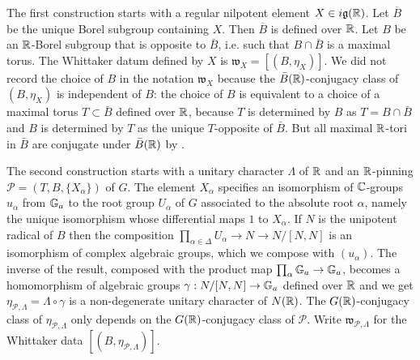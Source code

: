\documentclass{article}
\newtheorem{lem}[thm]{Lemma}
\theoremstyle{definition}
\numberwithin{equation}{section}
\renewcommand{\-}{\hyp{}}
\newcommand{\g}{\mathfrak g}
\renewcommand{\P}{\mathcal P}
\newcommand{\w}{\mathfrak w}
\begin{document}
The first construction starts with a regular nilpotent element $X\in i\g(\R)$. Let $\overline B$ be the unique Borel subgroup 
containing $X$. Then $\overline B$ is defined over $\mathbb{R}$. Let $B$ be an $\mathbb{R}$-Borel subgroup that is opposite to $\bar B$, i.e. such that $B \cap \bar B$ is a maximal torus. The Whittaker datum defined by $X$ is  $\w_X=[(B,\eta_X)]$. We did not record the choice of $B$ in the notation $\w_X$ because the $\bar B(\mathbb{R})$-conjugacy class of $(B,\eta_X)$ is independent of $B$: the choice of $B$ is equivalent to a choice of a maximal torus $T \subset \bar B$ defined over $\mathbb{R}$, because $T$ is determined by $B$ as $T=B \cap \bar B$ and $B$ is determined by $T$ as the unique $T$-opposite of $\bar B$. But all maximal $\mathbb{R}$-tori in $\bar B$ are conjugate under $\bar B(\mathbb{R})$ by \cite[Theorem 19.2]{Bor91}. 



The second construction starts with a unitary character $\Lambda$ of $\mathbb{R}$ and an $\mathbb{R}$-pinning $\P=(T,B,\{X_\alpha\})$ of $G$.  The element
$X_\alpha$ specifies an isomorphism of $\mathbb{C}$-groups $u_\alpha$ from $\mathbb{G}_a$ to the
root group $U_\alpha$ of $G$ associated to the absolute root $\alpha$,
namely the unique isomorphism whose differential maps $1$ to
$X_\alpha$. If $N$ is the unipotent radical of $B$ then the
composition $\prod_{\alpha \in \Delta} U_\alpha \to N \to N/[N,N]$ is
an isomorphism of complex algebraic groups, which we compose with
$(u_\alpha)$. The inverse of the result, composed with the product map
$\prod_\alpha \mathbb{G}_a \to \mathbb{G}_a$, becomes a homomorphism of
algebraic groups $\gamma : N/[N,N] \to \mathbb{G}_a$ defined over $\mathbb{R}$ and we get $\eta_{\P,\Lambda}=\Lambda\circ \gamma$ is a non-degenerate unitary character of $N(\mathbb{R})$.
The $G(\mathbb{R})$-conjugacy class of $\eta_{\P,\Lambda}$ only depends on the $G(\mathbb{R})$-conjugacy class of  $\P$.  Write $\w_{\P,\Lambda}$ for the Whittaker data
$[(B,\eta_{\P,\Lambda})]$.
\end{document}
